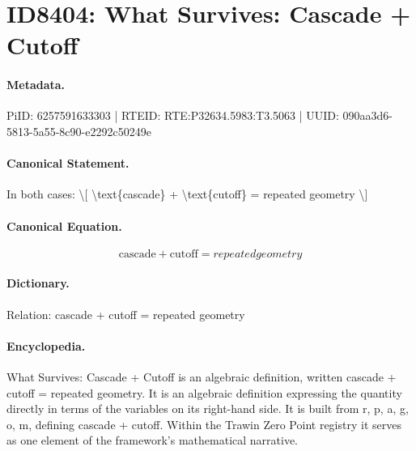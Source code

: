 \section*{ID8404: What Survives: Cascade + Cutoff}
\paragraph{Metadata.}
PiID: 6257591633303 | RTEID: RTE:P32634.5983:T3.5063 | UUID: 090aa3d6-5813-5a55-8c90-e2292c50249e

\paragraph{Canonical Statement.}
In both cases: \textbackslash{}[ \textbackslash{}text\{cascade\} + \textbackslash{}text\{cutoff\} = repeated geometry \textbackslash{}]

\paragraph{Canonical Equation.}
\[
\text{cascade} + \text{cutoff} = repeated geometry
\]

\paragraph{Dictionary.}
Relation: cascade + cutoff = repeated geometry

\paragraph{Encyclopedia.}
What Survives: Cascade + Cutoff is an algebraic definition, written cascade + cutoff = repeated geometry. It is an algebraic definition expressing the quantity directly in terms of the variables on its right-hand side. It is built from r, p, a, g, o, m, defining cascade + cutoff. Within the Trawin Zero Point registry it serves as one element of the framework's mathematical narrative.
